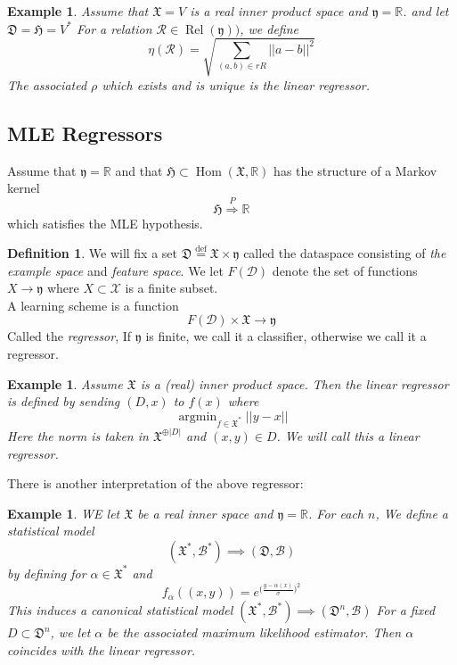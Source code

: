 \documentclass{book}
\theoremstyle{plain}
\newtheorem{example}[corollary]{Example}
\theoremstyle{definition}
\newtheorem{definition}[corollary]{Definition}
\DeclareMathOperator{\argmin}{argmin}
\renewcommand{\d}[1]{\mathbb{#1}}
\newcommand{\define}{\stackrel{\operatorname{def}}{=}}
\newcommand{\ds}{\oplus}
\newcommand{\f}[1]{\mathfrak{#1}}
\DeclareMathOperator{\Hom}{Hom}
\newcommand{\mor}{\longrightarrow}
\DeclareMathOperator{\Rel}{Rel}
\renewcommand{\r}[1]{\mathcal{#1}}
\renewcommand{\r}[1]{\mathcal{#1}}
\begin{document}
\begin{example}
Assume that $\f{X}=V$ is a real inner product space and $\f{y}=\d{R}$. and let $\f{D}=\f{H}=V^*$
For a relation $\r{R} \in \Rel(\f{y}))$, we define
\[
\eta(\r{R})=\sqrt{\sum_{(a,b) \in r{R}}\vert\vert a-b\vert \vert ^2}
\]
The associated $\rho$ which exists and is unique is the linear regressor.
\end{example}

\subsection{MLE Regressors}

Assume that $\f{y}=\d{R}$ and that $\f{H}\subset \Hom(\f{X},\d{R})$ has the structure of a Markov kernel
\[
\f{H}\stackrel{P}{\Longrightarrow} \d{R}
\]
which satisfies the MLE hypothesis.
\begin{definition}
We will fix a set $\f{D}\define \f{X}\times \f{y}$ called the dataspace consisting of \emph{the example space} and \emph{feature space}. We let $F(\r{D})$ denote the set of functions $X \mor \f{y}$ where $X\subset \r{X}$ is a finite subset.\\
A learning scheme is a function
\[
F(\r{D})\times \f{X}\mor \f{y}
\]
Called the \emph{regressor}, 
If $\f{y}$ is finite, we call it a classifier, otherwise we call it a regressor.
\end{definition}


\begin{example}
Assume $\f{X}$ is a (real) inner product space. Then the linear regressor is defined by sending $(D,x)$ to $f(x)$ where
\[
\argmin_{f\in \f{X}^*} \vert \vert y-x \vert \vert 
\]	
Here the norm is taken in $\f{X}^{\ds \vert D\vert }$ and $(x,y)\in D$. We will call this a linear regressor.
\end{example}

There is another interpretation of the above regressor:

\begin{example}
WE let $\f{X}$ be a real inner space and $\f{y}=\d{R}$. For each $n$, We define a statistical model
\[
(\f{X}^*,\r{B}^*)\implies (\f{D},\r{B})
\]
by defining for $\alpha \in \f{X}^*$ and
\[
f_{\alpha}((x,y))= e^{\bigg(\frac{y-\alpha(x)}{\sigma}\bigg)^2}
\] 
This induces a canonical statistical model  $(\f{X}^*,\r{B}^*)\implies (\f{D}^n,\r{B})$ 
For a fixed $D \subset \f{D}^n$, we let $\alpha$ be the associated maximum likelihood estimator. Then $\alpha$ coincides with the linear regressor.
\end{example}
\end{document}
